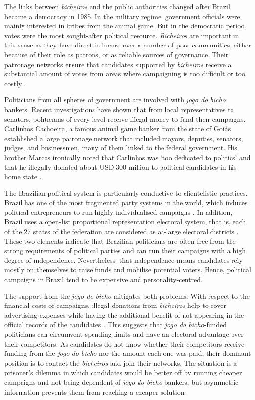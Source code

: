 \documentclass[a4paper,12pt]{article}
\begin{document}
The links between \emph{bicheiros} and the public authorities changed after Brazil became a democracy in 1985. In the military regime, government officials were mainly interested in bribes from the animal game. But in the democratic period, votes were the most sought-after political resource. \emph{Bicheiros} are important in this sense as they have direct influence over a number of poor communities, either because of their role as patrons, or as reliable sources of governance. Their patronage networks ensure that candidates supported by \emph{bicheiros} receive a substantial amount of votes from areas where campaigning is too difficult or too costly \citep[17]{misse2011crime}.

Politicians from all spheres of government are involved with \textit{jogo do bicho} bankers. Recent investigations have shown that from local representatives to senators, politicians of every level receive illegal money to fund their campaigns. Carlinhos Cachoeira, a famous animal game banker from the state of Goiás established a large patronage network that included mayors, deputies, senators, judges, and businessmen, many of them linked to the federal government. His brother Marcos ironically noted that Carlinhos was `too dedicated to politics' and that he illegally donated about USD 300 million to political candidates in his home state \citep{estadao2012gene}. 

The Brazilian political system is particularly conductive to clientelistic practices. Brazil has one of the most fragmented party systems in the world, which induces political entrepreneurs to run highly individualised campaigns \citep{figueiredo2000presidential,geddes1992institutional}. In addition, Brazil uses a open-list proportional representation electoral system, that is, each of the 27 states of the federation are considered as at-large electoral districts \citetext{\citealp{ames1995electoral}; \citealp[483]{samuels2000ambition}}. These two elements indicate that Brazilian politicians are often free from the strong requirements of political parties and can run their campaigns with a high degree of independence. Nevertheless, that independence means candidates rely mostly on themselves to raise funds and mobilise potential voters. Hence, political campaigns in Brazil tend to be expensive and personality-centred.

The support from the \emph{jogo do bicho} mitigates both problems. With respect to the financial costs of campaigns, illegal donations from \emph{bicheiros} help to cover advertising expenses while having the additional benefit of not appearing in the official records of the candidates \citep{congressoemfoco2007bicho,globo2012bicheiro}. This suggests that \emph{jogo do bicho}-funded politicians can circumvent spending limits and have an electoral advantage over their competitors. As candidates do not know whether their competitors receive funding from the \emph{jogo do bicho} nor the amount each one was paid, their dominant position is to contact the \emph{bicheiros} and join their networks. The situation is a prisoner's dilemma in which candidates would be better off by running cheaper campaigns and not being dependent of \emph{jogo do bicho} bankers, but asymmetric information prevents them from reaching a cheaper solution.
\end{document}
